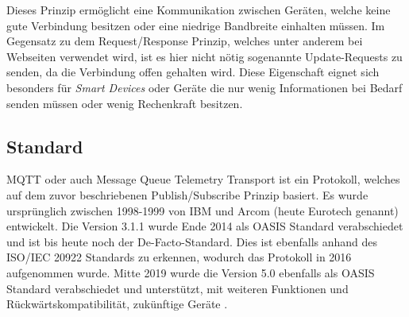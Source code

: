     Dieses Prinzip ermöglicht eine Kommunikation zwischen Geräten, welche keine gute Verbindung besitzen oder eine niedrige Bandbreite einhalten müssen. Im Gegensatz zu dem Request/Response Prinzip, welches unter anderem bei Webseiten verwendet wird, ist es hier nicht nötig sogenannte \glqq Update-Requests\grqq{} zu senden, da die Verbindung offen gehalten wird.
    Diese Eigenschaft eignet sich besonders für \emph{Smart Devices} oder Geräte die nur wenig Informationen bei Bedarf senden müssen oder wenig Rechenkraft besitzen.

    \subsection{Standard}
        \ac{MQTT} oder auch Message Queue Telemetry Transport ist ein Protokoll, welches auf dem zuvor beschriebenen Publish/Subscribe Prinzip basiert. Es wurde ursprünglich zwischen 1998-1999 von IBM und Arcom (heute Eurotech genannt) entwickelt. Die Version 3.1.1 wurde Ende 2014 als OASIS Standard verabschiedet und ist bis heute noch der De-Facto-Standard. Dies ist ebenfalls anhand des ISO/IEC 20922 Standards zu erkennen, wodurch das Protokoll in 2016 aufgenommen wurde. \cite{eclipse_foundation2017} Mitte 2019 wurde die Version 5.0 ebenfalls als OASIS Standard verabschiedet und unterstützt, mit weiteren Funktionen und Rückwärtskompatibilität, zukünftige Geräte \cite{mqtt_org_2019}.
        
